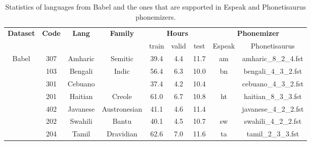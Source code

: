 \begin{table}[h!]
\caption{Statistics of languages from Babel and the ones that are supported in Espeak and Phonetisaurus phonemizers. \label{tab:data_babel}}
\begin{center}
\begin{tabular}{@{}ccccccccc@{}}
\toprule
\multirow{2}{*}{\textbf{Dataset}} & \multirow{2}{*}{\textbf{Code}} & \multirow{2}{*}{\textbf{Lang}} & \multirow{2}{*}{\textbf{Family}} & \multicolumn{3}{c}{\textbf{Hours}} & \multicolumn{2}{c}{\textbf{Phonemizer}} \\
                                  &                                &                                &                                  & train      & valid      & test     & Espeak     & Phonetisaurus              \\
\cmidrule(lr){1-1} \cmidrule(lr){2-4} \cmidrule(lr){5-7} \cmidrule(lr){8-9} 
\multirow{21}{*}{Babel}           & 307                            & Amharic                        & Semitic                          & 39.4       & 4.4        & 11.7     & am         & amharic\_8\_2\_4.fst       \\
                                  & 103                            & Bengali                        & Indic                            & 56.4       & 6.3        & 10.0     & bn         & bengali\_4\_3\_2.fst       \\
                                  & 301                            & Cebuano                        &                                  & 37.4       & 4.2        & 10.4     &            & cebuano\_4\_3\_2.fst       \\
                                  & 201                            & Haitian                        & Creole                           & 61.0       & 6.7        & 10.8     & ht         & haitian\_8\_3\_3.fst       \\
                                  & 402                            & Javanese                       & Austronesian                     & 41.1       & 4.6        & 11.4     &            & javanese\_4\_2\_2.fst      \\
                                  & 202                            & Swahili                        & Bantu                            & 40.1       & 4.5        & 10.7     & sw         & swahili\_4\_2\_2.fst       \\
                                  & 204                            & Tamil                          & Dravidian                        & 62.6       & 7.0        & 11.6     & ta         & tamil\_2\_3\_3.fst         \\

\end{tabular}
\end{center}
\end{table}
